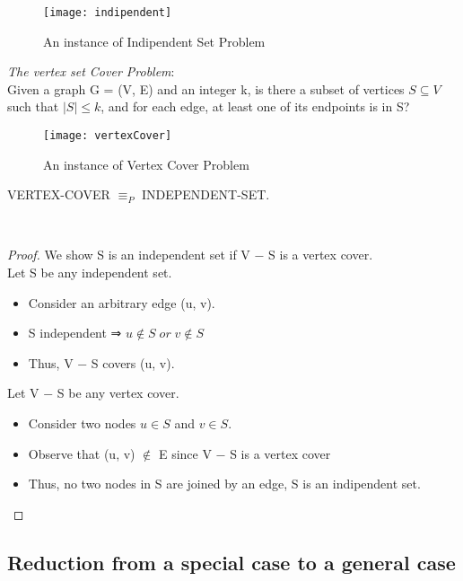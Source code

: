 \begin{figure}[H]
    \centering
    \texttt{[image: indipendent]}
    \caption{An instance of Indipendent Set Problem}
\end{figure}

\emph{The vertex set Cover Problem}:\\

Given a graph G = (V, E) and an integer k, is there a subset of vertices $S \subseteq V$ such that $|S| \leq k$, and for each edge, at least one of its endpoints is in S?

\begin{figure}[H]
    \centering
    \texttt{[image: vertexCover]}
    \caption{An instance of Vertex Cover Problem}
\end{figure}

\begin{claim}
    VERTEX-COVER $≡_{P}$ INDEPENDENT-SET.
\end{claim}\\

\begin{proof}
    We show S is an independent set if V − S is a vertex cover.\\

    Let S be any independent set.
    \begin{itemize}

        \item{Consider an arbitrary edge (u, v).}
        \item{S independent ⇒ $u \notin S \; or \;v \notin S$ }
        \item{Thus, V − S covers (u, v)}.
    \end{itemize}

    Let V − S be any vertex cover.
    \begin{itemize}
        \item{Consider two nodes $u \in S$ and $v \in S$.}
        \item{Observe that (u, v) $\notin$ E since V − S is a vertex cover }
        \item{Thus, no two nodes in S are joined by an edge, S is an indipendent set}.
    \end{itemize}

\end{proof}

\subsection{Reduction from a special case to a general case}

